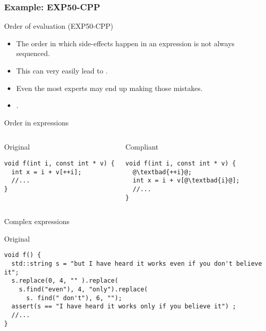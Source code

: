 \subsubsection{Example: EXP50-CPP}

\begin{frame}{Order of evaluation (EXP50-CPP)}
\begin{itemize}
  \item The order in which side-effects happen in an expression is not
        always sequenced.

  \vfill
  \item This can very easily lead to .

  \vfill
  \item Even the most experts may end up making those mistakes.

  \vfill
  \item {}.
\end{itemize}
\end{frame}

\begin{frame}[t,fragile]{Order in expressions}
\begin{columns}

\begin{block}{Original}
\begin{lstlisting}
void f(int i, const int * v) {
  int x = i + v[++i];
  //...
}
\end{lstlisting}
\end{block}

\pause
{}
\begin{block}{Compliant}
\begin{lstlisting}[escapechar=@]
void f(int i, const int * v) {
  @\textbad{++i}@;
  int x = i + v[@\textbad{i}@];
  //...
}
\end{lstlisting}
\end{block}

\end{columns}
\end{frame}

\begin{frame}[t,fragile]{Complex expressions}
\begin{block}{Original}
\begin{lstlisting}
void f() {
  std::string s = "but I have heard it works even if you don't believe it";
  s.replace(0, 4, "" ).replace(
    s.find("even"), 4, "only").replace(
      s. find(" don't"), 6, "");
  assert(s == "I have heard it works only if you believe it") ;
  //...
}
\end{lstlisting}
\end{block}
\end{frame}

